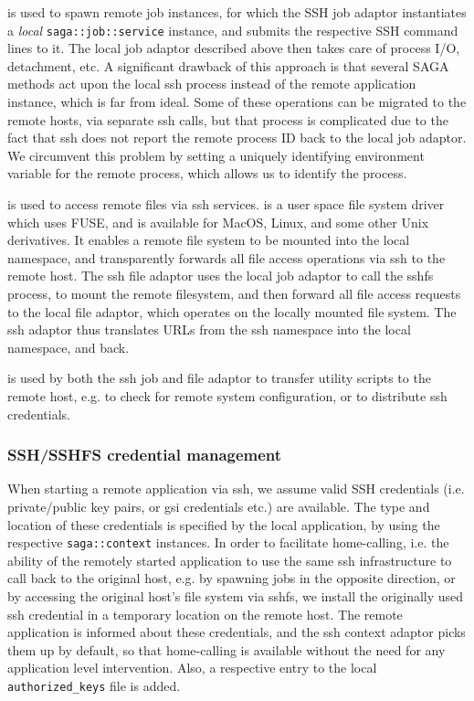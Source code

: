 \documentclass[conference,final]{IEEEtran}
\newcommand{\T}[1]{\texttt{#1}}
\newcommand{\I}[1]{\textit{#1}}
\newcommand{\ssh}[1]{\texttt{ssh}}
\newcommand{\scp}[1]{\texttt{scp}}
\newcommand{\sshfs}[1]{\texttt{sshfs}}
\begin{document}
{\texttt{\ssh}} is used to spawn remote job instances, for which the
SSH job adaptor instantiates a \I{local} \T{saga::job::service}
instance, and submits the respective SSH command lines to it.  The
local job adaptor described above then takes care of process I/O,
detachment, etc.  A significant drawback of this approach is that
several SAGA methods act upon the local ssh process instead of the
remote application instance, which is far from ideal. Some of these
operations can be migrated to the remote hosts, via separate ssh
calls, but that process is complicated due to the fact that ssh does
not report the remote process ID back to the local job adaptor.  We
circumvent this problem by setting a uniquely identifying environment
variable for the remote process, which allows us to identify the process.

{\texttt{\sshfs}} is used to access remote files via ssh services.
{\texttt{\sshfs}} is a user space file system driver which uses FUSE,
and is available for MacOS, Linux, and some other Unix derivatives.
It enables a remote file system to be mounted into the local
namespace, and transparently forwards all file access operations via
ssh to the remote host.  The ssh file adaptor uses the local job
adaptor to call the sshfs process, to mount the remote filesystem, and
then forward all file access requests to the local file adaptor, which
operates on the locally mounted file system.  The ssh adaptor thus
translates URLs from the ssh namespace into the local namespace, and
back.

{\texttt{\scp}} is used by both the ssh job and file adaptor to
transfer utility scripts to the remote host, e.g. to check for remote
system configuration, or to distribute ssh credentials.

\subsubsection{SSH/SSHFS credential management}
When starting a remote application via ssh, we assume valid SSH
credentials (i.e. private/public key pairs, or gsi credentials etc.)
are available.  The type and location of these credentials is
specified by the local application, by using the respective
\T{saga::context} instances.  In order to facilitate home-calling,
i.e. the ability of the remotely started application to use the same
ssh infrastructure to call back to the original host, e.g. by spawning
jobs in the opposite direction, or by accessing the original host's
file system via sshfs, we install the originally used ssh credential
in a temporary location on the remote host. The remote application is
informed about these credentials, and the ssh context adaptor picks
them up by default, so that home-calling is available without the need
for any application level intervention.  Also, a respective entry to
the local \T{authorized\_keys} file is added.
\end{document}
